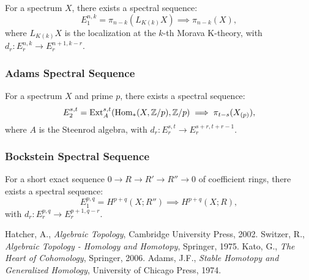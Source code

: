 \documentclass{article}
\begin{document}
\begin{theorem}
For a spectrum \( X \), there exists a spectral sequence:
\[
E_1^{n,k} = \pi_{n-k}(L_{K(k)} X) \implies \pi_{n-k}(X),
\]
where \( L_{K(k)} X \) is the localization at the \( k \)-th Morava K-theory, with \( d_r: E_r^{n,k} \to E_r^{n+1,k-r} \).
\end{theorem}

\subsubsection{Adams Spectral Sequence}

\begin{theorem}
For a spectrum \( X \) and prime \( p \), there exists a spectral sequence:
\[
E_2^{s,t} = \text{Ext}_A^{s,t}(\text{Hom}_*(X, \mathbb{Z}/p), \mathbb{Z}/p) \implies \pi_{t-s}(X_{(p)}),
\]
where \( A \) is the Steenrod algebra, with \( d_r: E_r^{s,t} \to E_r^{s+r, t+r-1} \).
\end{theorem}

\subsubsection{Bockstein Spectral Sequence}

\begin{theorem}
For a short exact sequence \( 0 \to R \to R' \to R'' \to 0 \) of coefficient rings, there exists a spectral sequence:
\[
E_1^{p,q} = H^{p+q}(X; R'') \implies H^{p+q}(X; R),
\]
with \( d_r: E_r^{p,q} \to E_r^{p+1,q-r} \).
\end{theorem}


\begin{thebibliography}{9}
 Hatcher, A., \emph{Algebraic Topology}, Cambridge University Press, 2002.
 Switzer, R., \emph{Algebraic Topology - Homology and Homotopy}, Springer, 1975.
 Kato, G., \emph{The Heart of Cohomology}, Springer, 2006.
 Adams, J.F., \emph{Stable Homotopy and Generalized Homology}, University of Chicago Press, 1974.
\end{thebibliography}
\end{document}
